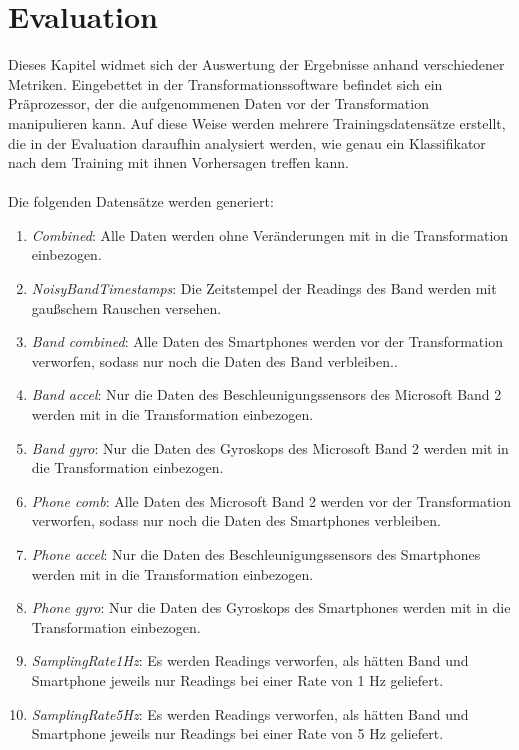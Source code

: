 \chapter{Evaluation}
\label{chap:evaluation}

Dieses Kapitel widmet sich der Auswertung der Ergebnisse anhand verschiedener Metriken. Eingebettet in der Transformationssoftware befindet sich ein Präprozessor, der die aufgenommenen Daten vor der Transformation manipulieren kann. Auf diese Weise werden mehrere Trainingsdatensätze erstellt, die in der Evaluation daraufhin analysiert werden, wie genau ein Klassifikator nach dem Training mit ihnen Vorhersagen treffen kann.
\\\\
Die folgenden Datensätze werden generiert:

\begin{enumerate}
\item \textit{Combined}: Alle Daten werden ohne Veränderungen mit in die Transformation einbezogen.
\item \textit{NoisyBandTimestamps}: Die Zeitstempel der Readings des Band werden mit gaußschem Rauschen versehen.
\item \textit{Band combined}: Alle Daten des Smartphones werden vor der Transformation verworfen, sodass nur noch die Daten des Band verbleiben..
\item \textit{Band accel}: Nur die Daten des Beschleunigungssensors des Microsoft Band 2 werden mit in die Transformation einbezogen.
\item \textit{Band gyro}: Nur die Daten des Gyroskops des Microsoft Band 2 werden mit in die Transformation einbezogen.
\item \textit{Phone comb}: Alle Daten des Microsoft Band 2 werden vor der Transformation verworfen, sodass nur noch die Daten des Smartphones verbleiben.
\item \textit{Phone accel}: Nur die Daten des Beschleunigungssensors des Smartphones werden mit in die Transformation einbezogen.
\item \textit{Phone gyro}: Nur die Daten des Gyroskops des Smartphones werden mit in die Transformation einbezogen.
\item \textit{SamplingRate1Hz}: Es werden Readings verworfen, als hätten Band und Smartphone jeweils nur Readings bei einer Rate von 1 Hz geliefert.
\item \textit{SamplingRate5Hz}: Es werden Readings verworfen, als hätten Band und Smartphone jeweils nur Readings bei einer Rate von 5 Hz geliefert.
\end{enumerate}

